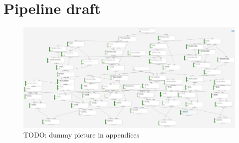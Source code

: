 
\clearpage


\thesisappendix

\section{Pipeline draft}\label{sec:app-pipeline-draft}

\begin{figure}[htb]
    \centering
    \includegraphics[width=\textheight,angle=90]{./appendices/pipeline-draft}
    \caption{TODO: dummy picture in appendices
    \label{fig:app-pipeline}}
\end{figure}


